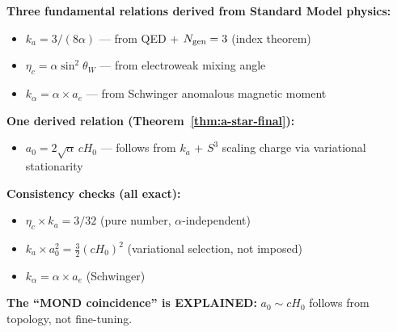 \begin{tcolorbox}[colback=blue!5!white, colframe=blue!50!black, title=Summary: The $\alpha$-Relations]
\textbf{Three fundamental relations derived from Standard Model physics:}
\begin{itemize}
\item $k_a = 3/(8\alpha)$ --- from QED + $N_{\rm gen} = 3$ (index theorem)
\item $\eta_c = \alpha \sin^2\theta_W$ --- from electroweak mixing angle
\item $k_\alpha = \alpha \times a_e$ --- from Schwinger anomalous magnetic moment
\end{itemize}

\textbf{One derived relation (Theorem~\ref{thm:a-star-final}):}
\begin{itemize}
\item $a_0 = 2\sqrt{\alpha}\,cH_0$ --- follows from $k_a$ + $S^3$ scaling charge via variational stationarity
\end{itemize}

\textbf{Consistency checks (all exact):}
\begin{itemize}
\item $\eta_c \times k_a = 3/32$ (pure number, $\alpha$-independent)
\item $k_a \times a_0^2 = \frac{3}{2}(cH_0)^2$ (variational selection, not imposed)
\item $k_\alpha = \alpha \times a_e$ (Schwinger)
\end{itemize}

\textbf{The ``MOND coincidence'' is EXPLAINED:} $a_0 \sim cH_0$ follows from topology, not fine-tuning.
\end{tcolorbox}
